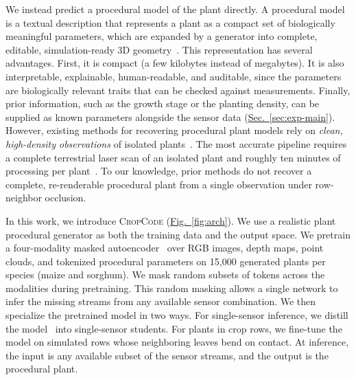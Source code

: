 \documentclass[10pt,twocolumn,letterpaper]{article}
\newcommand{\figref}[1]{\hyperref[#1]{Fig.~\ref*{#1}}}
\newcommand{\secref}[1]{\hyperref[#1]{Sec.~\ref*{#1}}}
\newcommand{\method}{\textup{\textsc{CropCode}}}   %
\begin{document}
We instead predict a procedural model of the plant directly. A procedural model is a textual description that represents a plant as a compact set of biologically meaningful parameters, which are expanded by a generator into complete, editable, simulation-ready 3D geometry~\citep{prusin1990abop, floraforge2026}. This representation has several advantages. First, it is compact (a few kilobytes instead of megabytes). It is also interpretable, explainable, human-readable, and auditable, since the parameters are biologically relevant traits that can be checked against measurements. Finally, prior information, such as the growth stage or the planting density, can be supplied as known parameters alongside the sensor data (\secref{sec:exp-main}). However, existing methods for recovering procedural plant models rely on \textit{clean, high-density observations} of isolated plants~\citep{cropcraft2026,demeter2025, ghrer2025paramplants}. The most accurate pipeline requires a complete terrestrial laser scan of an isolated plant and roughly ten minutes of processing per plant~\citep{hadadi2026vlmmaize}. To our knowledge, prior methods do not recover a complete, re-renderable procedural plant from a single observation under row-neighbor occlusion.

In this work, we introduce \method{} (\figref{fig:arch}). We use a realistic plant procedural generator as both the training data  and the output space. We pretrain a four-modality masked autoencoder~\citep{he2022mae,bachmann2022multimae,mizrahi2023fourm,dong2025embodiedmae} over RGB images, depth maps, point clouds, and tokenized procedural parameters on 15{,}000 generated plants per species (maize and sorghum). We mask random subsets of tokens across the modalities during pretraining. This random masking allows a single network to infer the missing streams from any available sensor combination. We then specialize the pretrained model in two ways. For single-sensor inference, we distill the model~\citep{hinton2015distillation} into single-sensor students. For plants in crop rows, we fine-tune the model on simulated rows whose neighboring leaves bend on contact. At inference, the input is any available subset of the sensor streams, and the output is the procedural plant.
\end{document}
